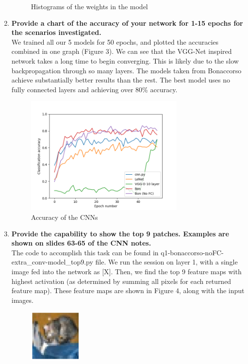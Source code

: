 \documentclass[11pt]{article}
\begin{document}
\begin{enumerate}
\begin{figure}[h!]
        \caption{Histograms of the weights in the model}
\end{figure}
\item \textbf{Provide a chart of the accuracy of your network for 1-15 epochs for the scenarios investigated.}\\
We trained all our 5 models for 50 epochs, and plotted the accuracies combined in one graph (Figure 3). We can see that the VGG-Net inspired network takes a long time to begin converging. This is likely due to the slow backpropagation through so many layers. The models taken from Bonaccorso achieve substantially better results than the rest. The best model uses no fully connected layers and achieving over 80\% accuracy.
\begin{figure}[h!]
    \centering
     \includegraphics[width=0.75\textwidth]{images/accuracy}
        \caption{Accuracy of the CNNs}
\end{figure}
\item \textbf{Provide the capability to show the top 9 patches. Examples are shown on slides 63-65 of the CNN notes.}\\
The code to accomplish this task can be found in q1-bonaccorso-noFC-extra\_conv-model\_top9.py file. We run the session on layer 1, with a single image fed into the network as [X]. Then, we find the top 9 feature maps with highest activation (as determined by summing all pixels for each returned feature map). These feature maps are shown in Figure 4, along with the input images.
\begin{figure}[h!]
    \centering
     \includegraphics[width=0.25\textwidth]{images/0_input_image}

\end{figure}
\end{enumerate}
\end{document}
